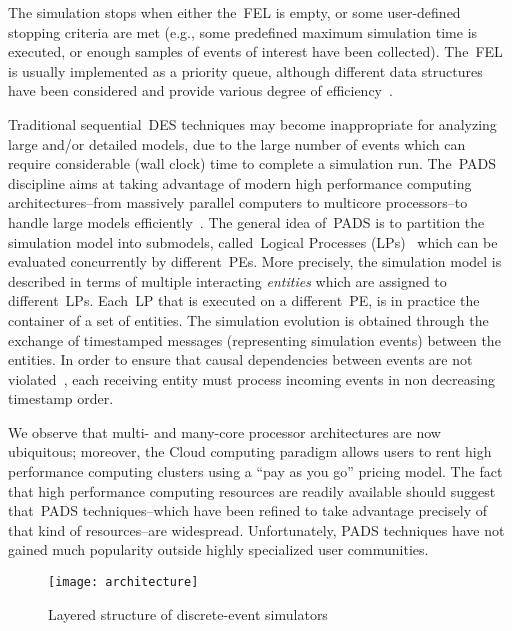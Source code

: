 \documentclass{sigplanconf}
\begin{document}
The simulation stops when either the~\ac{FEL} is empty, or some
user-defined stopping criteria are met (e.g., some predefined maximum
simulation time is executed, or enough samples of events of interest
have been collected). The~\ac{FEL} is usually implemented as a
priority queue, although different data structures have been
considered and provide various degree of efficiency~\cite{Jon86}.

Traditional sequential~\ac{DES} techniques may become inappropriate
for analyzing large and/or detailed models, due to the large number of
events which can require considerable (wall clock) time to complete a
simulation run. The~\ac{PADS} discipline aims at taking advantage of
modern high performance computing architectures--from massively
parallel computers to multicore processors--to handle large models
efficiently~\cite{Fuj90}. The general idea of~\ac{PADS} is to
partition the simulation model into submodels, called~Logical
Processes (LPs)~ which can be evaluated concurrently by
different~\acp{PE}. More precisely, the simulation model is described
in terms of multiple interacting \emph{entities} which are assigned to
different~\acp{LP}. Each~\ac{LP} that is executed on a
different~\ac{PE}, is in practice the container of a set of
entities. The simulation evolution is obtained through the exchange of
timestamped messages (representing simulation events) between the
entities. In order to ensure that causal dependencies between events
are not violated~\cite{Lamport78}, each receiving entity must process
incoming events in non decreasing timestamp order.

We observe that multi- and many-core processor architectures are now
ubiquitous; moreover, the Cloud computing paradigm allows users to
rent high performance computing clusters using a ``pay as you go''
pricing model. The fact that high performance computing resources are
readily available should suggest that~\ac{PADS} techniques--which have
been refined to take advantage precisely of that kind of
resources--are widespread. Unfortunately, \ac{PADS} techniques have
not gained much popularity outside highly specialized user
communities.

\begin{figure*}[t]
\centering\texttt{[image: architecture]}
\caption{Layered structure of discrete-event simulators}\label{fig:architecture}
\end{figure*}
\end{document}
